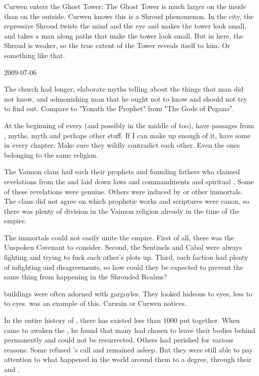 Curwen enters the Ghost Tower:
The Ghost Tower is much larger on the inside than on the outside.
Curwen knows this is a Shroud phenomenon.
In the city, the repressive Shroud twists the mind and the eye and makes the tower look small, and takes a man along paths that make the tower look small.
But in here, the Shroud is weaker, so the true extent of the Tower reveals itself to him.
Or something like that.



2009-07-06

The \Iquinian church had longer, elaborate myths telling about the things that man did not know, and admonishing man that he ought not to know and should not try to find out.
Compare to "Yonath the Prophet" from "The Gods of Pegana".

At the beginning of every  (and possibly in the middle of  too), have passages from \WanderersInDarknessEmph, \Iquinian myths, \Ortaican myth and perhaps other stuff.
If I can make up enough of it, have some in every chapter.
Make sure they wildly contradict each other.
Even the ones belonging to the same religion.

The Vaimon clans had each their prophets and founding fathers who claimed revelations from the \sephiroth and laid down laws and commandments and spiritual .
Some of these revelations were genuine.
Others were induced by \qliphoth or other immortals.
The clans did not agree on which prophetic works and scriptures were canon, so there was plenty of division in the Vaimon religion already in the time of the empire.

The immortals could not easily unite the empire.
First of all, there was the Unspoken Covenant to consider.
Second, the Sentinels and Cabal were always fighting and trying to fuck each other's plots up.
Third, each faction had plenty of infighting and disagreements, so how could they be expected to prevent the same thing from happening in the Shrouded Realms?

\Ortaican buildings were often adorned with gargoyles.
They looked hideous to \human eyes, less to to \scathaese eyes.
\Forklin was an example of this.
Carzain or Curwen notices.

In the entire history of \Miith, there has existed less than 1000 \dragons put together.
When \Sethicus came to awaken the \dragons, he found that many had chosen to leave their bodies behind permanently and could not be resurrected.
Others had perished for various reasons.
Some refused \Sethicus's call and remained asleep.
But they were still able to pay attention to what happened in the world around them to a degree, through their \daemons and \homunculi.



